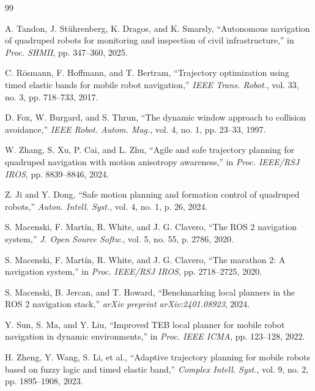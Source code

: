\documentclass[lettersize,journal]{IEEEtran}
\begin{document}
\begin{thebibliography}{99}

A. Tandon, J. St\"uhrenberg, K. Dragos, and K. Smarsly, ``Autonomous navigation of quadruped robots for monitoring and inspection of civil infrastructure,'' in \textit{Proc. SHMII}, pp. 347--360, 2025.

C. R\"osmann, F. Hoffmann, and T. Bertram, ``Trajectory optimization using timed elastic bands for mobile robot navigation,'' \textit{IEEE Trans. Robot.}, vol. 33, no. 3, pp. 718--733, 2017.

D. Fox, W. Burgard, and S. Thrun, ``The dynamic window approach to collision avoidance,'' \textit{IEEE Robot. Autom. Mag.}, vol. 4, no. 1, pp. 23--33, 1997.

W. Zhang, S. Xu, P. Cai, and L. Zhu, ``Agile and safe trajectory planning for quadruped navigation with motion anisotropy awareness,'' in \textit{Proc. IEEE/RSJ IROS}, pp. 8839--8846, 2024.

Z. Ji and Y. Dong, ``Safe motion planning and formation control of quadruped robots,'' \textit{Auton. Intell. Syst.}, vol. 4, no. 1, p. 26, 2024.

S. Macenski, F. Mart\'in, R. White, and J. G. Clavero, ``The ROS 2 navigation system,'' \textit{J. Open Source Softw.}, vol. 5, no. 55, p. 2786, 2020.

S. Macenski, F. Mart\'in, R. White, and J. G. Clavero, ``The marathon 2: A navigation system,'' in \textit{Proc. IEEE/RSJ IROS}, pp. 2718--2725, 2020.

S. Macenski, B. Jercan, and T. Howard, ``Benchmarking local planners in the ROS 2 navigation stack,'' \textit{arXiv preprint arXiv:2401.08923}, 2024.

Y. Sun, S. Ma, and Y. Liu, ``Improved TEB local planner for mobile robot navigation in dynamic environments,'' in \textit{Proc. IEEE ICMA}, pp. 123--128, 2022.

H. Zheng, Y. Wang, S. Li, et al., ``Adaptive trajectory planning for mobile robots based on fuzzy logic and timed elastic band,'' \textit{Complex Intell. Syst.}, vol. 9, no. 2, pp. 1895--1908, 2023.


\end{thebibliography}
\end{document}
